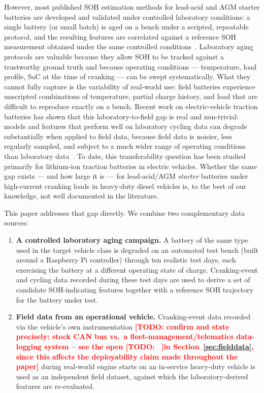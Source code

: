 \documentclass[conference]{IEEEtran}
\newcommand{\todo}[1]{\textcolor{red}{\textbf{[TODO: #1]}}}
\begin{document}
However, most published SOH estimation methods for lead-acid and AGM starter batteries are developed and validated under controlled laboratory conditions: a single battery (or small batch) is aged on a bench under a scripted, repeatable protocol, and the resulting features are correlated against a reference SOH measurement obtained under the same controlled conditions~\cite{lead_acid_impedance_aging,eis_soh_timedep,ruetschi_aging}. Laboratory aging protocols are valuable because they allow SOH to be tracked against a trustworthy ground truth and because operating conditions --- temperature, load profile, SoC at the time of cranking --- can be swept systematically. What they cannot fully capture is the variability of real-world use: field batteries experience unscripted combinations of temperature, partial charge history, and load that are difficult to reproduce exactly on a bench. Recent work on electric-vehicle traction batteries has shown that this laboratory-to-field gap is real and non-trivial: models and features that perform well on laboratory cycling data can degrade substantially when applied to field data, because field data is noisier, less regularly sampled, and subject to a much wider range of operating conditions than laboratory data~\cite{labfield_gap,transferable_capacity_estimation,multimodal_ev_field}. To date, this transferability question has been studied primarily for lithium-ion traction batteries in electric vehicles. Whether the same gap exists --- and how large it is --- for lead-acid/AGM \emph{starter} batteries under high-current cranking loads in heavy-duty diesel vehicles is, to the best of our knowledge, not well documented in the literature.

This paper addresses that gap directly. We combine two complementary data sources:

\begin{enumerate}
\item \textbf{A controlled laboratory aging campaign.} A battery of the same type used in the target vehicle class is degraded on an automated test bench (built around a Raspberry Pi controller) through ten realistic test days, each exercising the battery at a different operating state of charge. Cranking-event and cycling data recorded during these test days are used to derive a set of candidate SOH-indicating features together with a reference SOH trajectory for the battery under test.
\item \textbf{Field data from an operational vehicle.} Cranking-event data recorded via the vehicle's own instrumentation \todo{confirm and state precisely: stock CAN bus vs.\ a fleet-management/telematics data-logging system -- see the open \todo\ in Section~\ref{sec:fielddata}, since this affects the deployability claim made throughout the paper} during real-world engine starts on an in-service heavy-duty vehicle is used as an independent field dataset, against which the laboratory-derived features are re-evaluated.
\end{enumerate}
\end{document}
